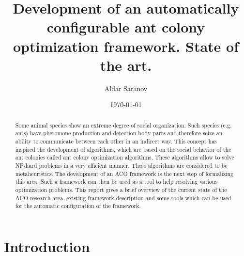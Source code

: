 \documentclass[12pt]{article}
\author{Aldar Saranov}
\date{\today}
\title{Development of an automatically configurable ant colony optimization framework. State of the art.}
\begin{document}
\maketitle 
\newpage

\tableofcontents
\newpage

\begin{abstract}
Some animal species show an extreme degree of social organization. Such species (e.g. ants) have pheromone production and detection body parts and therefore seize an ability to communicate between each other in an indirect way. This concept has inspired the development of algorithms, which are based on the social behavior of the ant colonies called ant colony optimization algorithms. These algorithms allow to solve NP-hard problems in a very efficient manner. These algorithms are considered to be metaheuristics. The development of an ACO framework is the next step of formalizing this area. Such a framework can then be used as a tool to help resolving various optimization problems. This report gives a brief overview of the current state of the ACO research area, existing framework description and some tools which can be used for the automatic configuration of the framework.
\end{abstract}




\section{Introduction}
\end{document}
